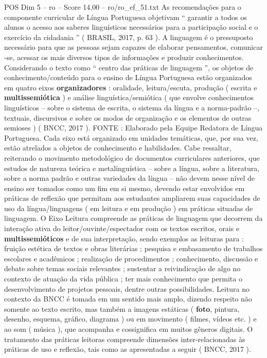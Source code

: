 \begin{textsample}{POS Dim 5 – ro – Score 14.00 – ro/ro\_ef\_51.txt}
As recomendações para o componente curricular de Língua Portuguesa objetivam “ garantir a todos os alunos o acesso aos saberes linguísticos necessários para a participação social e o exercício da cidadania ” ( BRASIL, 2017, p. 63 ).
A linguagem é o pressuposto necessário para que as pessoas sejam capazes de elaborar pensamentos, comunicar -se, acessar os mais diversos tipos de informações e produzir conhecimentos.
Considerando o texto como “ centro das práticas de linguagem ”, os objetos de conhecimento/conteúdo para o ensino de Língua Portuguesa estão organizados em quatro eixos \textbf{organizadores} : oralidade, leitura/escuta, produção ( escrita e \textbf{multissemiótica} ) e análise linguística/semiótica ( que envolve conhecimentos linguísticos – sobre o sistema de escrita, o sistema da língua e a norma-padrão –, textuais, discursivos e sobre os modos de organização e os elementos de outras semioses ) ( BNCC, 2017 ).
FONTE : Elaborado pela Equipe Redatora de Língua Portuguesa.
Cada eixo está organizado em unidades temáticas, que, por sua vez, estão atrelados a objetos de conhecimento e habilidades.
Cabe ressaltar, reiterando o movimento metodológico de documentos curriculares anteriores, que estudos de natureza teórica e metalinguística – sobre a língua, sobre a literatura, sobre a norma padrão e outras variedades da língua – não devem nesse nível de ensino ser tomados como um fim em si mesmo, devendo estar envolvidos em práticas de reflexão que permitam aos estudantes ampliarem suas capacidades de uso da língua/linguagens ( em leitura e em produção ) em práticas situadas de linguagem.
O Eixo Leitura compreende as práticas de linguagem que decorrem da interação ativa do leitor/ouvinte/espectador com os textos escritos, orais e \textbf{multissemióticos} e de sua interpretação, sendo exemplos as leituras para : fruição estética de textos e obras literárias ; pesquisa e embasamento de trabalhos escolares e acadêmicos ; realização de procedimentos ; conhecimento, discussão e debate sobre temas sociais relevantes ; sustentar a reivindicação de algo no contexto de atuação da vida pública ; ter mais conhecimento que permita o desenvolvimento de projetos pessoais, dentre outras possibilidades.
Leitura no contexto da BNCC é tomada em um sentido mais amplo, dizendo respeito não somente ao texto escrito, mas também a imagens estáticas ( \textbf{foto}, pintura, desenho, esquema, gráfico, diagrama ) ou em movimento ( filmes, vídeos etc. ) e ao som ( música ), que acompanha e cossignifica em muitos gêneros digitais.
O tratamento das práticas leitoras compreende dimensões inter-relacionadas às práticas de uso e reflexão, tais como as apresentadas a seguir ( BNCC, 2017 ).

\end{textsample}
